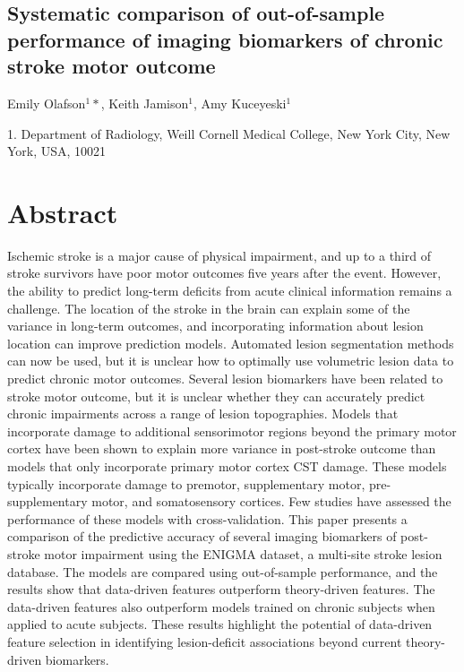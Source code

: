 \documentclass[10pt]{article}
\begin{document}
 

\begin{center}
{\large \section*{Systematic comparison of out-of-sample performance of imaging biomarkers of chronic stroke motor outcome }}
\end{center}

\begin{center}
Emily Olafson$^1*$, Keith Jamison$^1$, Amy Kuceyeski$^1$
\end{center}

    1. \textmd{Department of Radiology, Weill Cornell Medical College, New York City, New York, USA, 10021} 


\section{Abstract}
Ischemic stroke is a major cause of physical impairment, and up to a third of stroke survivors have poor motor outcomes five years after the event. However, the ability to predict long-term deficits from acute clinical information remains a challenge. The location of the stroke in the brain can explain some of the variance in long-term outcomes, and incorporating information about lesion location can improve prediction models. Automated lesion segmentation methods can now be used, but it is unclear how to optimally use volumetric lesion data to predict chronic motor outcomes. Several lesion biomarkers have been related to stroke motor outcome, but it is unclear whether they can accurately predict chronic impairments across a range of lesion topographies. Models that incorporate damage to additional sensorimotor regions beyond the primary motor cortex have been shown to explain more variance in post-stroke outcome than models that only incorporate primary motor cortex CST damage. These models typically incorporate damage to premotor, supplementary motor, pre-supplementary motor, and somatosensory cortices. Few studies have assessed the performance of these models with cross-validation. This paper presents a comparison of the predictive accuracy of several imaging biomarkers of post-stroke motor impairment using the ENIGMA dataset, a multi-site stroke lesion database. The models are compared using out-of-sample performance, and the results show that data-driven features outperform theory-driven features. The data-driven features also outperform models trained on chronic subjects when applied to acute subjects. These results highlight the potential of data-driven feature selection in identifying lesion-deficit associations beyond current theory-driven biomarkers.
\end{document}
